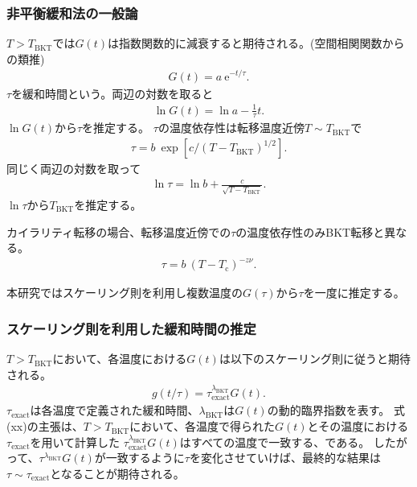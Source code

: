 \documentclass[12pt,titlepage,dvipdfmx]{jarticle}
\begin{document}
\subsubsection{非平衡緩和法の一般論}

$T>T_{\mathrm{BKT}}$では$G(t)$は指数関数的に減衰すると期待される。(空間相関関数からの類推)
\begin{align}
   G(t) =  a \ \mathrm e^{-t/\tau}.
\end{align}
$\tau$を緩和時間という。両辺の対数を取ると
\begin{align}
   \ln{G(t)} = \ln{a}-\frac{1}{\tau}t.
\end{align}
$\ln{G(t)}$から$\tau$を推定する。
$\tau$の温度依存性は転移温度近傍$T\sim T_{\mathrm{BKT}}$で
\begin{align}
   \tau = b \ \exp [c/(T-T_{\mathrm{BKT}})^{1/2}].
\end{align}
同じく両辺の対数を取って
\begin{align}
   \ln{\tau} = \ln{b} + \frac{c}{\sqrt{T-T_{\mathrm{BKT}}}}.
\end{align}
$\ln{\tau}$から$T_{\mathrm{BKT}}$を推定する。

カイラリティ転移の場合、転移温度近傍での$\tau$の温度依存性のみBKT転移と異なる。
\begin{align}
   \tau = b \ (T-T_{\mathrm{c}})^{-z\nu}.
\end{align}

本研究ではスケーリング則を利用し複数温度の$G(\tau)$から$\tau$を一度に推定する。

\newpage

\subsubsection{スケーリング則を利用した緩和時間の推定}

$T>T_{\mathrm{BKT}}$において、各温度における$G(t)$は以下のスケーリング則に従うと期待される。
\begin{align}
   g(t/\tau) = \tau_{\mathrm{exact}}^{\lambda_{\mathrm{BKT}}}G(t).
\end{align}
$\tau_{\mathrm{exact}}$は各温度で定義された緩和時間、$\lambda_{\mathrm{BKT}}$は$G(t)$の動的臨界指数を表す。
式(xx)の主張は、$T>T_{\mathrm{BKT}}$において、各温度で得られた$G(t)$とその温度における$\tau_{\mathrm{exact}}$を用いて計算した
$\tau_{\mathrm{exact}}^{\lambda_{\mathrm{BKT}}}G(t)$はすべての温度で一致する、である。
したがって、$\tau^{\lambda_{\mathrm{BKT}}}G(t)$が一致するように$\tau$を変化させていけば、最終的な結果は$\tau\sim\tau_{\mathrm{exact}}$となることが期待される。
\end{document}
